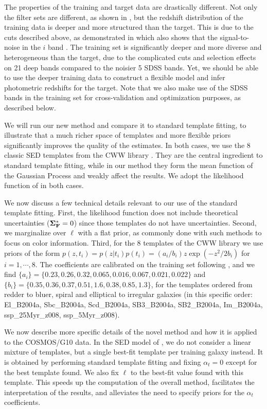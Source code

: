 \documentclass[aps,prd,showpacs,superscriptaddress,groupedaddress]{revtex4}  %
\begin{document}
The properties of the training and target data are drastically different.
Not only the filter sets are different, as shown in , but the redshift distribution of the training data is deeper and more structured than the target.
This is due to the cuts described above, as demonstrated in  which also shows that the signal-to-noise in the $i$ band .
The training set is significantly deeper and more diverse and heterogeneous than the target, due to the complicated cuts and selection effects on 21 deep bands compared to the noisier 5 SDSS bands.
Yet, we should be able to use the deeper training data to construct a flexible model and infer photometric redshifts for the target.
Note that we also make use of the SDSS bands in the training set for cross-validation and optimization purposes, as described below.

We will run our new method and compare it to standard template fitting, to illustrate that a much richer space of templates and more flexible priors significantly improves the quality of the \photoz estimates.
In both cases, we use the 8 classic SED templates from the CWW library \citep{Coleman:1980ej, Benitez:1998br}. 
They are the central ingredient to standard template fitting, while in our method they form the mean function of the Gaussian Process and weakly affect the results. 
We adopt the likelihood function of  in both cases.

We now discuss a few technical details relevant to our use of the standard template fitting.
First, the likelihood function does not include theoretical uncertainties ($\mat{\Sigma}^*_\mat{F}=0$) since those templates do not have uncertainties. 
Second, we marginalize over $\ell$ with a flat prior, as commonly done with such \photoz methods to focus on color information.
Third, for the 8 templates of the CWW library we use priors of the form $p(z,t_i)= p(z|t_i)p(t_i) = ({a_i}/{b_i} ) z \exp(-{z^2}/{2 b_i} ) $ for $i=1, \cdots, 8$. 
The coefficients are calibrated on the training set following \citep{Coleman:1980ej, Benitez:1998br}, and we find
$\{a_i\} = \{ 0.23, 0.26, 0.32, 0.065, 0.016, 0.067, 0.021, 0.022 \}$ and $\{b_i\} = \{ 0.35, 0.36, 0.37, 0.51, 1.6, 0.38, 0.85, 1.3\}$, for the templates ordered from redder to bluer, \ie spiral and elliptical to irregular galaxies (in this specific order: El\_B2004a, Sbc\_B2004a, Scd\_B2004a, SB3\_B2004a, SB2\_B2004a, Im\_B2004a, ssp\_25Myr\_z008, ssp\_5Myr\_z008).

We now describe more specific details of the novel method and how it is applied to the COSMOS/G10 data.
In the SED model of , we do not consider a linear mixture of templates, but a single best-fit template per training galaxy instead.
It is obtained by performing standard template fitting and fixing $\alpha_t=0$ except for the best template found. 
We also fix $\ell$ to the best-fit value found with this template.
This speeds up the computation of the overall method, facilitates the interpretation of the results, and alleviates the need to specify priors for the $\alpha_t$ coefficients.
\end{document}
